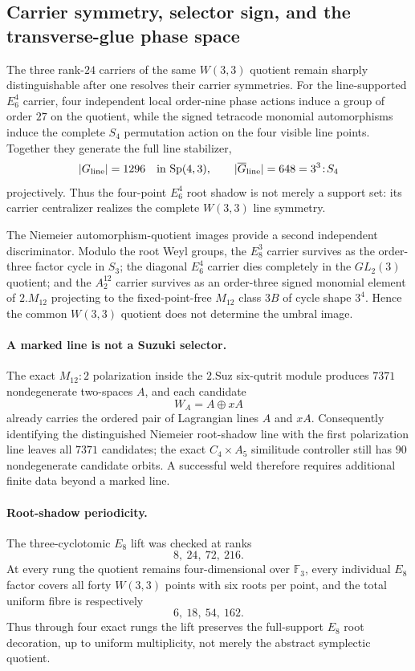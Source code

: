 \subsection*{Carrier symmetry, selector sign, and the transverse-glue phase space}

The three rank-$24$ carriers of the same $W(3,3)$ quotient remain sharply distinguishable after one resolves their carrier symmetries.  For the line-supported $E_6^4$ carrier, four independent local order-nine phase actions induce a group of order $27$ on the quotient, while the signed tetracode monomial automorphisms induce the complete $S_4$ permutation action on the four visible line points.  Together they generate the full line stabilizer,
\[
 |G_{\rm line}|=1296\quad\hbox{in }\mathrm{Sp}(4,3),
 \qquad
 |\overline G_{\rm line}|=648=3^3\!:\!S_4
\]
projectively.  Thus the four-point $E_6^4$ root shadow is not merely a support set: its carrier centralizer realizes the complete $W(3,3)$ line symmetry.

The Niemeier automorphism-quotient images provide a second independent discriminator.  Modulo the root Weyl groups, the $E_8^3$ carrier survives as the order-three factor cycle in $S_3$; the diagonal $E_6^4$ carrier dies completely in the $GL_2(3)$ quotient; and the $A_2^{12}$ carrier survives as an order-three signed monomial element of $2.M_{12}$ projecting to the fixed-point-free $M_{12}$ class $3B$ of cycle shape $3^4$.  Hence the common $W(3,3)$ quotient does not determine the umbral image.

\paragraph{A marked line is not a Suzuki selector.}
The exact $M_{12}{:}2$ polarization inside the $2.\mathrm{Suz}$ six-qutrit module produces $7371$ nondegenerate two-spaces $A$, and each candidate
\[
 W_A=A\oplus xA
\]
already carries the ordered pair of Lagrangian lines $A$ and $xA$.  Consequently identifying the distinguished Niemeier root-shadow line with the first polarization line leaves all $7371$ candidates; the exact $C_4\times A_5$ similitude controller still has $90$ nondegenerate candidate orbits.  A successful weld therefore requires additional finite data beyond a marked line.

\paragraph{Root-shadow periodicity.}
The three-cyclotomic $E_8$ lift was checked at ranks
\[
8,\ 24,\ 72,\ 216.
\]
At every rung the quotient remains four-dimensional over $\mathbb F_3$, every individual $E_8$ factor covers all forty $W(3,3)$ points with six roots per point, and the total uniform fibre is respectively
\[
6,\ 18,\ 54,\ 162.
\]
Thus through four exact rungs the lift preserves the full-support $E_8$ root decoration, up to uniform multiplicity, not merely the abstract symplectic quotient.


